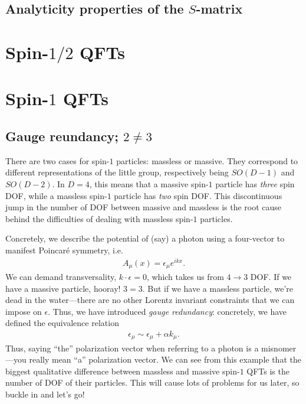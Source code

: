 \documentclass[11pt]{article}
\begin{document}
\subsection{Analyticity properties of the $S$-matrix}



\section{Spin-$1/2$ QFTs}



\section{Spin-$1$ QFTs}


\subsection{Gauge reundancy; $2 \neq 3$}

There are two cases for spin-$1$ particles: massless or massive.
They correspond to different representations of the little group,
respectively being $SO(D - 1)$ and $SO(D - 2)$. In $D = 4$, this means
that a massive spin-$1$ particle has \emph{three} spin DOF,
while a massless spin-$1$ particle has \emph{two} spin DOF.
This discontinuous jump in the number of DOF between massive and massless
is the root cause behind the difficulties of dealing with massless spin-$1$
particles.

Concretely, we describe the potential of (say) a photon using
a four-vector to manifest Poincaré symmetry, i.e.
\begin{align*}
    A_\mu(x) = \epsilon_\mu e^{ikx}.
\end{align*}
We can demand transversality, $k \cdot \epsilon = 0$, which takes us
from $4 \to 3$ DOF. If we have a massive particle, hooray! $3 = 3$.
But if we have a massless particle, we're dead in the water---there are no
other Lorentz invariant constraints that we can impose on $\epsilon$.
Thus, we have introduced \emph{gauge redundancy}: concretely, we
have defined the equivalence relation
\begin{align*}
    \epsilon_\mu \sim \epsilon_\mu + \alpha k_\mu.
\end{align*}
Thus, saying ``the'' polarization vector when referring to a photon
is a misnomer---you really mean ``a'' polarization vector. We can
see from this example that the biggest qualitative difference
between massless and massive spin-$1$ QFTs is the number of DOF
of their particles. This will cause lots of problems for us later,
so buckle in and let's go!
\end{document}
